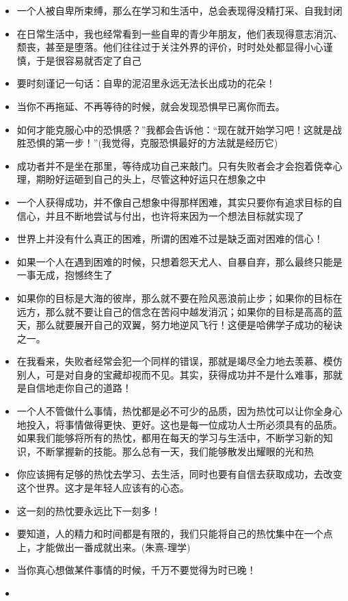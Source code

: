 \documentclass[UTF8,a4paper,8pt]{ctexart}
\begin{document}
\begin{itemize}
 	\item 一个人被自卑所束缚，那么在学习和生活中，总会表现得没精打采、自我封闭
 	\item 在日常生活中，我也经常看到一些自卑的青少年朋友，他们表现得意志消沉、颓丧，甚至是堕落。他们往往过于关注外界的评价，时时处处都显得小心谨慎，于是很容易就否定了自己
 	\item 要时刻谨记一句话：自卑的泥沼里永远无法长出成功的花朵！
 	\item 当你不再拖延、不再等待的时候，就会发现恐惧早已离你而去。
 	\item 如何才能克服心中的恐惧感？”我都会告诉他：“现在就开始学习吧！这就是战胜恐惧的第一步！”(我觉得，克服恐惧最好的方法就是经历它)
 	\item 成功者并不是坐在那里，等待成功自己来敲门。只有失败者会才会抱着侥幸心理，期盼好运砸到自己的头上，尽管这种好运只在想象之中
 	\item 一个人获得成功，并不像自己想象中得那样困难，其实只要你有追求目标的自信心，并且不断地尝试与付出，也许将来因为一个想法目标就实现了
 	\item 世界上并没有什么真正的困难，所谓的困难不过是缺乏面对困难的信心！
 	\item 如果一个人在遇到困难的时候，只想着怨天尤人、自暴自弃，那么最终只能是一事无成，抱憾终生了
 	\item 如果你的目标是大海的彼岸，那么就不要在险风恶浪前止步；如果你的目标在远方，那么就不要让自己的信念在苦闷中越发消沉；如果你的目标是高高的蓝天，那么就要展开自己的双翼，努力地逆风飞行！这便是哈佛学子成功的秘诀之一。
 	\item 在我看来，失败者经常会犯一个同样的错误，那就是竭尽全力地去羡慕、模仿别人，可是对自身的宝藏却视而不见。其实，获得成功并不是什么难事，那就是自信地走你自己的道路！
 	\item 一个人不管做什么事情，热忱都是必不可少的品质，因为热忱可以让你全身心地投入，将事情做得更快、更好。这也是每一位成功人士所必须具有的品质。如果我们能够将所有的热忱，都用在每天的学习与生活中，不断学习新的知识，不断掌握新的技能。那么总有一天，我们能够散发出耀眼的光和热
 	\item 你应该拥有足够的热忱去学习、去生活，同时也要有自信去获取成功，去改变这个世界。这才是年轻人应该有的心态。
 	\item 这一刻的热忱要永远比下一刻多！
 	\item 
 	要知道，人的精力和时间都是有限的，我们只能将自己的热忱集中在一个点上，才能做出一番成就出来。(朱熹-理学)
 	\item 当你真心想做某件事情的时候，千万不要觉得为时已晚！
 	\item 

\end{itemize}
\end{document}
